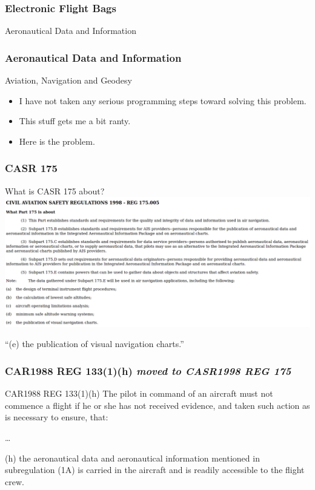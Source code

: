 \begin{frame}
\frametitle{Electronic Flight Bags}
\begin{center}
Aeronautical Data and Information
\end{center}
\end{frame}

\begin{frame}
\frametitle{Aeronautical Data and Information}
\begin{block}{Aviation, Navigation and Geodesy}
\begin{itemize}
\item<1-> I have not taken any serious programming steps toward solving this problem.
\item<2-> This stuff gets me a bit ranty.
\item<3-> Here is the problem.
\end{itemize}
\end{block}
\end{frame}

\begin{frame}
\frametitle{CASR 175}
\begin{block}{What is CASR 175 about?}
\includegraphics[height=0.5\textheight]{image/casr175_005.png}
\end{block}
\par
``(e) the publication of visual navigation charts.''
\end{frame}

\begin{frame}
\frametitle{CAR1988 REG 133(1)(h) \emph{moved to CASR1998 REG 175}}
\scriptsize
\begin{block}{CAR1988 REG 133(1)(h)}
The pilot in command of an aircraft must not commence a flight if he or she has not received evidence, and taken such action as is necessary to ensure, that:
\par
\ldots
\par
(h)  the aeronautical data and aeronautical information mentioned in subregulation (1A) is carried in the aircraft and is readily accessible to the flight crew.
\end{block}
\par
\end{frame}

